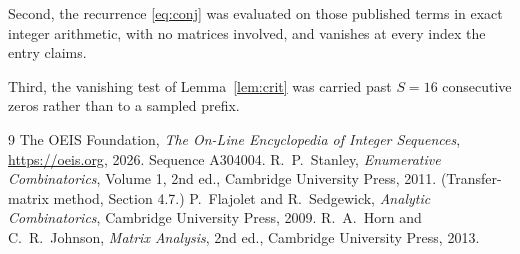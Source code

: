 \documentclass[11pt,a4paper]{article}
\theoremstyle{plain}
\theoremstyle{definition}
\begin{document}
Second, the recurrence \eqref{eq:conj} was evaluated on those published terms in exact
integer arithmetic, with no matrices involved, and vanishes at every index the entry claims.

Third, the vanishing test of Lemma~\ref{lem:crit} was carried past $S=16$ consecutive
zeros rather than to a sampled prefix.

\begin{thebibliography}{9}
 The OEIS Foundation, \emph{The On-Line Encyclopedia of Integer
Sequences}, \url{https://oeis.org}, 2026. Sequence A304004.
 R.~P.~Stanley, \emph{Enumerative Combinatorics}, Volume 1, 2nd ed.,
Cambridge University Press, 2011. (Transfer-matrix method, Section 4.7.)
 P.~Flajolet and R.~Sedgewick, \emph{Analytic Combinatorics}, Cambridge
University Press, 2009.
 R.~A.~Horn and C.~R.~Johnson, \emph{Matrix Analysis}, 2nd ed., Cambridge
University Press, 2013.
\end{thebibliography}
\end{document}
